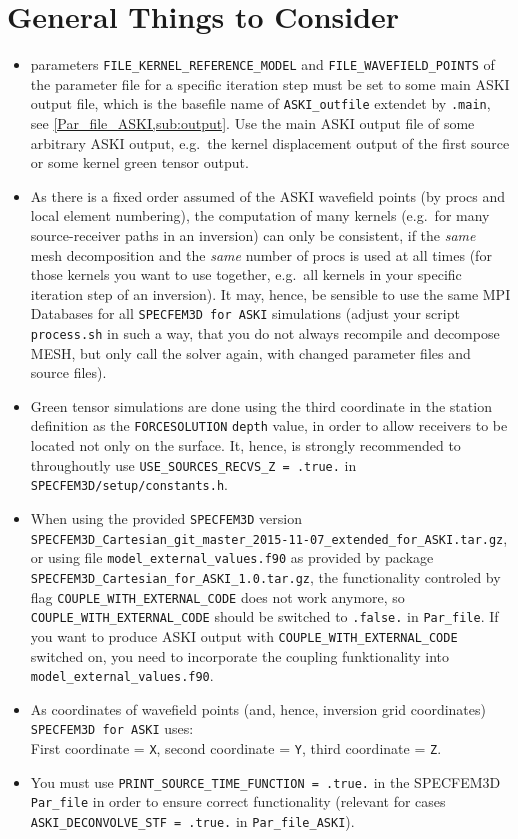 \documentclass[12pt,a4paper]{article}
\newcommand{\lcode}[1]{\nolinkurl{#1}}
\newcommand{\ASKI}{ {\ttfamily ASKI} }
\begin{document}
\section{General Things to Consider} \label{general_stuff}
%
\begin{itemize}
\item parameters \lcode{FILE_KERNEL_REFERENCE_MODEL} and \lcode{FILE_WAVEFIELD_POINTS} 
  of the parameter file for a specific iteration step must be set to some main \ASKI output file,
  which is the basefile name of \lcode{ASKI_outfile} extendet by \lcode{.main}, see \ref{Par_file_ASKI,sub:output}.
  Use the main \ASKI output file of some arbitrary \ASKI output, e.g.\ the kernel displacement output of the first source
  or some kernel green tensor output.
\item As there is a fixed order assumed of the \ASKI wavefield points (by procs and local element numbering), the 
  computation of many kernels (e.g.\ for many source-receiver paths in an inversion) can only be consistent, if the 
  \emph{same} mesh decomposition and the \emph{same} number of procs is used at all times 
  (for those kernels you want to use together, e.g.\ all kernels in your specific iteration step of an inversion).
  It may, hence, be sensible to use the same MPI Databases for all \lcode{SPECFEM3D for ASKI} simulations (adjust your 
  script \lcode{process.sh} in such a way, that you do not always recompile and decompose MESH, but only call the solver
  again, with changed parameter files and source files).
\item Green tensor simulations are done using the third coordinate in the station definition as the 
  \lcode{FORCESOLUTION} \lcode{depth} value, in order to allow receivers to be located not only on the surface.
  It, hence, is strongly recommended to throughoutly use \lcode{USE_SOURCES_RECVS_Z = .true.} in \lcode{SPECFEM3D/setup/constants.h}.
\item When using the provided \lcode{SPECFEM3D} version
  \lcode{SPECFEM3D_Cartesian_git_master_2015-11-07_extended_for_ASKI.tar.gz}, or using file \lcode{model_external_values.f90}
  as provided by package \lcode{SPECFEM3D_Cartesian_for_ASKI_1.0.tar.gz}, the functionality controled by 
  flag \lcode{COUPLE_WITH_EXTERNAL_CODE} does not work anymore, so \lcode{COUPLE_WITH_EXTERNAL_CODE} should be switched
  to \lcode{.false.} in \lcode{Par_file}. If you want to produce \ASKI output with \lcode{COUPLE_WITH_EXTERNAL_CODE}
  switched on, you need to incorporate the coupling funktionality into \lcode{model_external_values.f90}.
\item As coordinates of wavefield points (and, hence, inversion grid coordinates) \\
  \lcode{SPECFEM3D for ASKI} uses:\\
  First coordinate = \lcode{X}, second coordinate = \lcode{Y}, third coordinate = \lcode{Z}.
\item You must use \lcode{PRINT_SOURCE_TIME_FUNCTION = .true.} in the SPECFEM3D \lcode{Par_file} in order to ensure correct
  functionality (relevant for cases \lcode{ASKI_DECONVOLVE_STF = .true.} in \lcode{Par_file_ASKI}).
\end{itemize}
\end{document}

